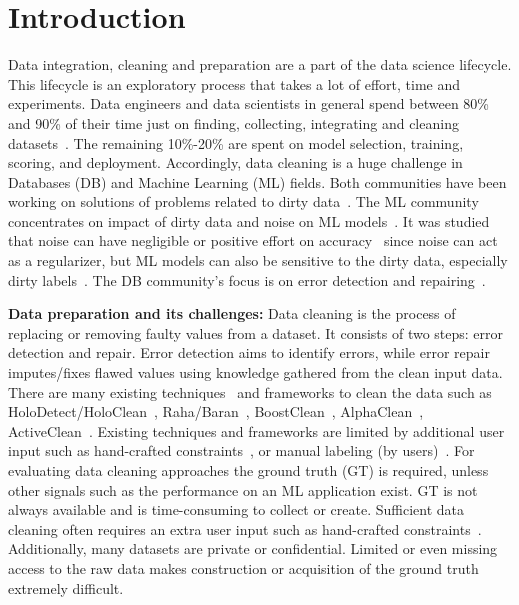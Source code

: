 \chapter{Introduction}
Data integration, cleaning and preparation are a part of the data science lifecycle. 
This lifecycle is an exploratory process that takes a lot of effort, time and experiments.
Data engineers and data scientists in general spend between 80\% and 90\% of their time just on finding, collecting, integrating and cleaning datasets~\cite{80cleansurvey, dataintegration80}. The remaining 10\%-20\% are spent on model selection, training, scoring, and deployment.
Accordingly, data cleaning is a huge challenge in Databases (DB) and Machine Learning (ML) fields.
Both communities have been working on solutions of problems related to dirty data~\cite{cleanml}. 
The ML community concentrates on impact of dirty data and noise on ML models~\cite{cleanml}.
It was studied that noise can have negligible or positive effort on accuracy~\cite{processingsys, outperformstudy} since noise can act as a regularizer, but ML models can also be sensitive to the dirty data, especially dirty labels~\cite{classificationnoisesurvey}.
The DB community's focus is on error detection and repairing~\cite{Hellerstein08quantitativedata, duplicatesstudy}.

\textbf{Data preparation and its challenges:}
Data cleaning is the process of replacing or removing faulty values from a dataset.
It consists of two steps: error detection and repair.
Error detection aims to identify errors, while error repair imputes/fixes flawed values using knowledge gathered from the clean input data. 
There are many existing techniques~\cite{duplicatesstudy, tdeexcel} and frameworks to clean the data such as HoloDetect/HoloClean~\cite{HeidariMIR2019, RekatsinasCIR2017}, Raha/Baran~\cite{raha, baran}, BoostClean~\cite{boostclean}, AlphaClean~\cite{alphaclean}, ActiveClean~\cite{activeclean}. 
Existing techniques and frameworks are limited by additional user input such as hand-crafted constraints~\cite{bart}, or manual labeling (by users)~\cite{raha, baran}.
For evaluating data cleaning approaches the ground truth (GT) is required, unless other signals such as the performance on an ML application exist.
GT is not always available and is time-consuming to collect or create.
Sufficient data cleaning often requires an extra user input such as hand-crafted constraints~\cite{bart}.
Additionally, many datasets are private or confidential. 
Limited or even missing access to the raw data makes construction or acquisition of the ground truth extremely difficult. 

